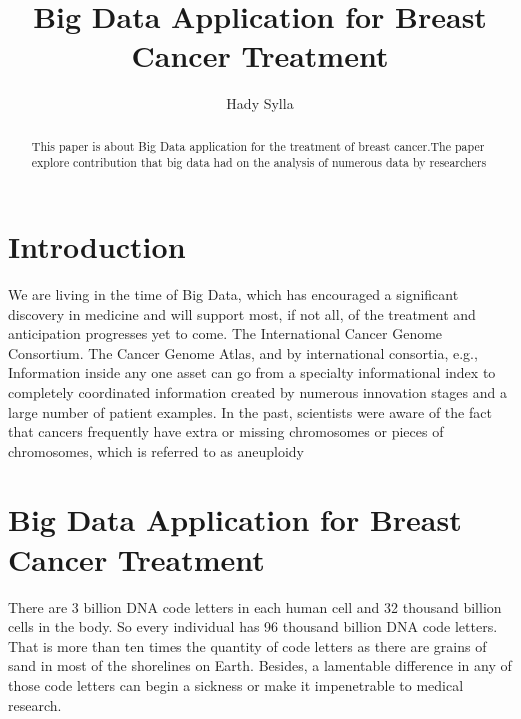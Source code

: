 \documentclass[sigconf]{acmart}
\begin{document}
\title{Big Data Application for Breast Cancer Treatment}


\author{Hady Sylla}




\begin{abstract}
This paper is about Big Data application for the treatment of breast cancer.The paper explore contribution that big data had on the analysis of numerous data by researchers
\end{abstract}




\maketitle


\section{Introduction}

We are living in the time of Big Data, which has encouraged a significant discovery in medicine and will support most, if not all, of the treatment and anticipation progresses yet to come\cite{murdoch2013inevitable}.  The International Cancer Genome Consortium.  The Cancer Genome Atlas, and by international consortia, e.g., Information inside any one asset can go from a specialty informational index to completely coordinated information created by numerous innovation stages and a large number of patient examples\cite{murdoch2013inevitable}.  In the past, scientists were aware of the fact that cancers frequently have extra or missing chromosomes or pieces of chromosomes, which is referred to as aneuploidy 

\section{Big Data Application for Breast Cancer Treatment}

There are 3 billion DNA code letters in each human cell and 32 thousand billion cells in the body. So every individual has 96 thousand billion DNA code letters\cite{marchini2004}. That is more than ten times the quantity of code letters as there are grains of sand in most of the shorelines on Earth. Besides, a lamentable difference in any of those code letters can begin a sickness or make it impenetrable to medical research\cite{marchini2004}.
\end{document}
